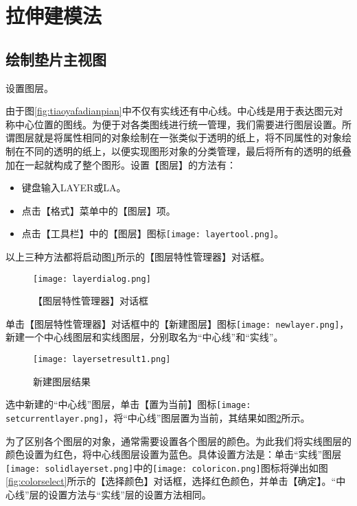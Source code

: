 \section{拉伸建模法}
\subsection{绘制垫片主视图}\label{sec:dianpian}
\begin{procedure}
\item 设置图层。

由于图\ref{fig:tiaoyafadianpian}中不仅有实线还有中心线。中心线是用于表达图元对称中心位置的图线。为便于对各类图线进行统一管理，我们需要进行图层设置。所谓图层就是将属性相同的对象绘制在一张类似于透明的纸上，将不同属性的对象绘制在不同的透明的纸上，以便实现图形对象的分类管理，最后将所有的透明的纸叠加在一起就构成了整个图形。设置【图层】的方法有：
\begin{itemize}
\item 键盘输入LAYER或LA。
\item 点击【格式】菜单中的【图层】项。
\item 点击【工具栏】中的【图层】图标\texttt{[image: layertool.png]}。
\end{itemize}
以上三种方法都将启动图\ref{fig:layerdialog}所示的【图层特性管理器】对话框。
\begin{figure}[htbp]
\centering
\texttt{[image: layerdialog.png]}
\caption{【图层特性管理器】对话框}\label{fig:layerdialog}
\end{figure}

单击【图层特性管理器】对话框中的【新建图层】图标\texttt{[image: newlayer.png]}，新建一个中心线图层和实线图层，分别取名为“中心线”和“实线”。

\begin{figure}[htbp]
\centering
\texttt{[image: layersetresult1.png]}
\caption{新建图层结果}\label{fig:layersetresult1}
\end{figure}

选中新建的“中心线”图层，单击【置为当前】图标\texttt{[image: setcurrentlayer.png]}，将“中心线”图层置为当前，其结果如图\ref{fig:layersetresult1}所示。

为了区别各个图层的对象，通常需要设置各个图层的颜色。为此我们将实线图层的颜色设置为红色，将中心线图层设置为蓝色。具体设置方法是：单击“实线”图层\texttt{[image: solidlayerset.png]}中的\texttt{[image: coloricon.png]}图标将弹出如图\ref{fig:colorselect}所示的【选择颜色】对话框，选择红色颜色，并单击【确定】。“中心线”层的设置方法与“实线”层的设置方法相同。


\end{procedure}
